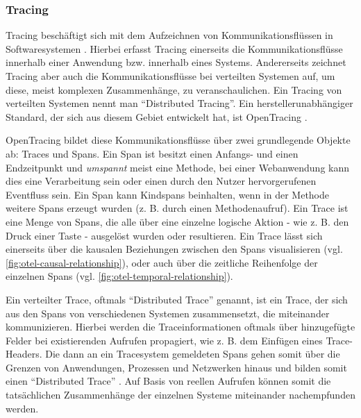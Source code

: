 \subsubsection{Tracing}
\label{sec:tracing}

Tracing beschäftigt sich mit dem Aufzeichnen von Kommunikationsflüssen in Softwaresystemen \cite{TowardsPerformanceToolingInteroperability}. Hierbei erfasst Tracing einerseits die Kommunikationsflüsse innerhalb einer Anwendung bzw. innerhalb eines Systems. Andererseits zeichnet Tracing aber auch die Kommunikationsflüsse bei verteilten Systemen auf, um diese, meist komplexen Zusammenhänge, zu veranschaulichen. Ein Tracing von verteilten Systemen nennt man \enquote{Distributed Tracing}. Ein herstellerunabhängiger Standard, der sich aus diesem Gebiet entwickelt hat, ist OpenTracing \cite{OpenTracing}.

OpenTracing bildet diese Kommunikationsflüsse über zwei grundlegende Objekte ab: Traces und Spans. Ein Span ist besitzt einen Anfangs- und einen Endzeitpunkt und \textit{umspannt} meist eine Methode, bei einer Webanwendung kann dies eine Verarbeitung sein oder einen durch den Nutzer hervorgerufenen Eventfluss sein. Ein Span kann Kindspans beinhalten, wenn in der Methode weitere Spans erzeugt wurden (z. B. durch einen Methodenaufruf). Ein Trace ist eine Menge von Spans, die alle über eine einzelne logische Aktion - wie z. B. den Druck einer Taste - ausgelöst wurden oder resultieren. Ein Trace lässt sich einerseits über die kausalen Beziehungen zwischen den Spans visualisieren (vgl. \autoref{fig:otel-causal-relationship}), oder auch über die zeitliche Reihenfolge der einzelnen Spans (vgl. \autoref{fig:otel-temporal-relationship}).

Ein verteilter Trace, oftmals \enquote{Distributed Trace} genannt, ist ein Trace, der sich aus den Spans von verschiedenen Systemen zusammensetzt, die miteinander kommunizieren. Hierbei werden die Traceinformationen oftmals über hinzugefügte Felder bei existierenden Aufrufen propagiert, wie z. B. dem Einfügen eines Trace-Headers. Die dann an ein Tracesystem gemeldeten Spans gehen somit über die Grenzen von Anwendungen, Prozessen und Netzwerken hinaus und bilden somit einen \enquote{Distributed Trace} \cite{OpenTracingSpecification}. Auf Basis von reellen Aufrufen können somit die tatsächlichen Zusammenhänge der einzelnen Systeme miteinander nachempfunden werden.

